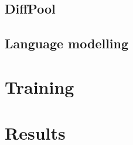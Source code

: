 \documentclass[switch, 12pt]{article}
\begin{document}
\begin{multicols}{2}
    \subsection{DiffPool}

    \cite{ying-2018}

    \subsection{Language modelling}

    \section{Training}

    \section{Results}

    \newpage

    

\end{multicols}
\end{document}
